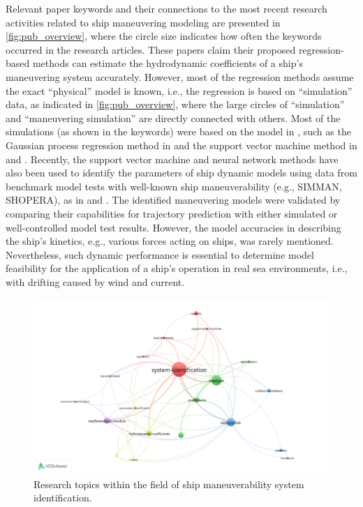 Relevant paper keywords and their connections to the most recent research activities related to ship maneuvering modeling are presented in \autoref{fig:pub_overview}, where the circle size indicates how often the keywords occurred in the research articles. These papers claim their proposed regression-based methods can estimate the hydrodynamic coefficients of a ship’s maneuvering system accurately. However, most of the regression methods assume the exact “physical” model is known, i.e., the regression is based on “simulation” data, as indicated in \autoref{fig:pub_overview}, where the large circles of “simulation” and “maneuvering simulation” are directly connected with others.
Most of the simulations (as shown in the keywords) were based on the model in \citet{fossen_handbook_2021}, such as the Gaussian process regression method in \citet{xue_system_2020} and the support vector machine method in \citet{wang_identification_2019} and \citet{wang_parameter_2021}. Recently, the support vector machine and neural network methods have also been used to identify the parameters of ship dynamic models using data from benchmark model tests with well-known ship maneuverability (e.g., SIMMAN, SHOPERA), as in \citet{wang_kernel-based_2020} and \citet{wakita_neural_2021}. The identified maneuvering models were validated by comparing their capabilities for trajectory prediction with either simulated or well-controlled model test results. However, the model accuracies in describing the ship’s kinetics, e.g., various forces acting on ships, was rarely mentioned. Nevertheless, such dynamic performance is essential to determine model feasibility for the application of a ship’s operation in real sea environments, i.e., with drifting caused by wind and current.
\begin{figure}[h]
  \includegraphics[width=\textwidth]{figures/keywords.png}
  \caption{Research topics within the field of ship maneuverability system identification.}
  \label{fig:pub_overview}
\end{figure}

